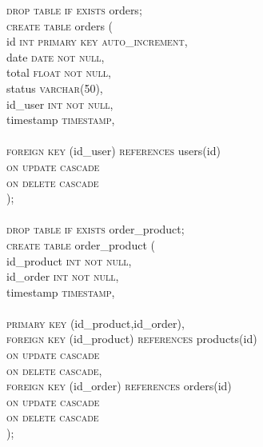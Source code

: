 \documentclass{article}
\begin{document}
\textsc{\textcolor{sentence}{drop table if exists}} orders;\\
\textsc{\textcolor{sentence}{create table}} orders (\\
\phantom{abc} id \textsc{\textcolor{sentence}{int primary key auto\_increment}},\\
\phantom{abc} date \textsc{\textcolor{sentence}{date not null}},\\
\phantom{abc} total 
\textsc{\textcolor{sentence}{float not null}},\\
\phantom{abc} status \textsc{\textcolor{sentence}{varchar\textcolor{numberSQL}{(50)}}},\\
\phantom{abc} id\_user \textsc{\textcolor{sentence}{int not null}},\\
\phantom{abc} timestamp \textsc{\textcolor{sentence}{timestamp}},\\\\
\phantom{abc} \textsc{\textcolor{sentence}{foreign key}} (id\_user) \textsc{\textcolor{sentence}{references}} users(id)\\
\phantom{abc} \textsc{\textcolor{sentence}{on update cascade}}\\
\phantom{abc} \textsc{\textcolor{sentence}{on delete  cascade}}\\
);\\\\
\textsc{\textcolor{sentence}{drop table if exists}} order\_product;\\
\textsc{\textcolor{sentence}{create table}} order\_product (\\
\phantom{abc} id\_product \textsc{\textcolor{sentence}{int not null}},\\
\phantom{abc} id\_order \textsc{\textcolor{sentence}{int not null}},\\
\phantom{abc} timestamp \textsc{\textcolor{sentence}{timestamp}},\\\\
\phantom{abc} \textsc{\textcolor{sentence}{primary key}} (id\_product,id\_order),\\
\phantom{abc} \textsc{\textcolor{sentence}{foreign key}} (id\_product) \textsc{\textcolor{sentence}{references}} products(id)\\
\phantom{abc} \textsc{\textcolor{sentence}{on update cascade}}\\
\phantom{abc} \textsc{\textcolor{sentence}{on delete  cascade}},\\
\phantom{abc} \textsc{\textcolor{sentence}{foreign key}} (id\_order) \textsc{\textcolor{sentence}{references}} orders(id)\\
\phantom{abc} \textsc{\textcolor{sentence}{on update cascade}}\\
\phantom{abc} \textsc{\textcolor{sentence}{on delete  cascade}}\\
);
\end{document}
